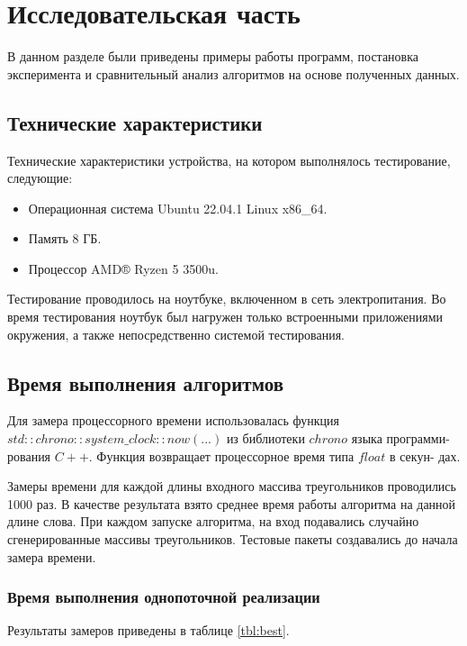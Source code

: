 \chapter{Исследовательская часть}

В данном разделе были приведены примеры работы программ, постановка эксперимента и сравнительный анализ алгоритмов на основе полученных данных.

\section{Технические характеристики}

Технические характеристики устройства, на котором выполнялось тестирование, следующие:

\begin{itemize}
	\item Операционная система Ubuntu 22.04.1 \cite{ubuntu} Linux x86\_64.
	\item Память 8 ГБ.
	\item Процессор AMD® Ryzen 5 3500u.
\end{itemize}

Тестирование проводилось на ноутбуке, включенном в сеть электропитания. Во время тестирования ноутбук был нагружен только встроенными приложениями окружения, а также непосредственно системой тестирования.

\section{Время выполнения алгоритмов}

Для замера процессорного времени использовалась функция
$std::chrono::system\_clock::now(...)$ из библиотеки $chrono$ языка программи-
рования $C++$. Функция возвращает процессорное время типа $float$ в секун-
дах.

Замеры времени для каждой длины входного массива треугольников проводились 1000 раз. В качестве результата взято среднее время работы алгоритма на данной длине слова. При каждом запуске алгоритма, на вход подавались случайно сгенерированные массивы треугольников. Тестовые пакеты создавались до начала замера времени.

\subsection{Время выполнения однопоточной реализации}

Результаты замеров приведены в таблице \ref{tbl:best}.

